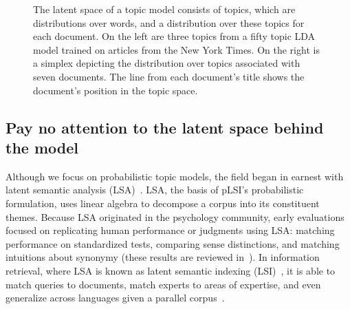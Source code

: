 \begin{figure}[t]
{  \label{fig:nyttopics:doc}
}
\caption{The latent space of a topic model consists of topics,
  which are distributions over words, and a distribution over these
  topics for each document.  On the left are three topics from a
  fifty topic LDA model trained on articles from the New York
  Times.  On the right is a simplex depicting the distribution
  over topics associated with seven documents.  The line from each
  document's title shows the document's position in the topic
  space.}
\label{fig:nyttopics:big}
\end{figure}








\subsection*{Pay no attention to the latent space behind the model}

Although we focus on probabilistic topic models, the field began in
earnest with latent semantic analysis (LSA)~\cite{landauer-97}.  LSA,
the basis of pLSI's probabilistic formulation, uses linear algebra to
decompose a corpus into its constituent themes.  Because LSA
originated in the psychology community, early evaluations focused on
replicating human performance or judgments using LSA: matching
performance on standardized tests, comparing sense distinctions, and
matching intuitions about synonymy (these results are reviewed
in~\cite{landauer-02}).  In information retrieval, where LSA is known
as latent semantic indexing (LSI)~\cite{deerwester-90}, it is able to
match queries to documents, match experts to areas of expertise, and
even generalize across languages given a parallel
corpus~\cite{berry-95}.

